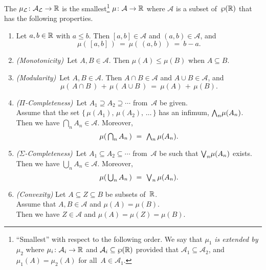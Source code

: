 \begin{dfn}
\label{D:lebesgue-measure}
The 
$\mu_{\mathcal{L}} \colon \mathcal{A}_{\mathcal{L}} \rightarrow \mathbb{R}$
is the smallest\footnote{%
``Smallest'' with respect to the following order.
We say that $\mu_1$ \emph{is extended by}~$\mu_2$
where $\mu_i\colon \mathcal{A}_i \rightarrow \mathbb{R}$
and $\mathcal{A}_i \subseteq \wp(\mathbb{R})$
provided that
$\mathcal{A}_1 \subseteq \mathcal{A}_2$,
and $\mu_1(A) = \mu_2(A)$
for all~$A\in\mathcal{A}_1$.}
$\mu\colon \mathcal{A} \rightarrow \mathbb{R}$
where $\mathcal{A}$ is a subset of~$\wp(\mathbb{R})$
that has the following properties.
\begin{enumerate}
\item
\label{prop:measure-1}
Let $a,b\in\mathbb{R}$ with $a\leq b$. Then $[a,b]\in\mathcal{A}$
and $(a,b)\in\mathcal{A}$, 
and
\begin{equation*}
\mu(\,[a,b]\,)
\ = \ \mu(\,(a,b)\,)
\ =\ b-a.
\end{equation*}

\item
\label{prop:measure-2}
\textit{(Monotonicity)}\ 
Let $A,B\in \mathcal{A}$.
Then $\mu(A)\leq \mu(B)$
when  $A\subseteq B$.

\item
\label{prop:measure-3}
\textit{(Modularity)}\ 
Let $A,B\in \mathcal{A}$.
Then $A\cap B\in\mathcal{A}$ and $A\cup B \in \mathcal{A}$, and
\begin{equation*}
\mu(\,A\cap B\,)\,+\,\mu(\,A\cup B\,)\ =\ \mu(A)\,+\,\mu(B).
\end{equation*}

\item
\label{prop:measure-4}
\textit{($\Pi$-Completeness)}\ 
Let $A_1 \supseteq A_2 \supseteq \dotsb$
from~$\mathcal{A}$ be given.\\
Assume that the set $\{\,\mu(A_1),\, \mu(A_2),\, \dotsc\,\}$
has an infimum, $\textstyle{\bigwedge}_n \mu(A_n)$.\\
Then we have $\bigcap_n A_n \in \mathcal{A}$.
Moreover,
\begin{equation*}
\mu(\, \textstyle{ \bigcap_n A_n }\,) \ =\ \textstyle{\bigwedge}_n \,\mu(A_n).
\end{equation*}

\item
\label{prop:measure-5}
\textit{($\Sigma$-Completeness)}\ 
Let $A_1 \subseteq A_2 \subseteq \dotsb$
from~$\mathcal{A}$ 
be such that $\textstyle{\bigvee}_n \mu(A_n)$ exists.\\
Then we have $\bigcup_n A_n \in \mathcal{A}$.
Moreover,
\begin{equation*}
\mu(\, \textstyle{ \bigcup_n A_n }\,) \ =\ \textstyle{\bigvee}_n \,\mu(A_n).
\end{equation*}

\item
\label{prop:measure-6}
\textit{(Convexity)}
Let $A\subseteq Z \subseteq B$ be subsets of~$\mathbb{R}$.\\
Assume that $A,B\in\mathcal{A}$ and $\mu(A)=\mu(B)$.\\
Then we have $Z\in \mathcal{A}$ and $\mu(A) = \mu(Z)= \mu(B)$.
\end{enumerate}
\end{dfn}



